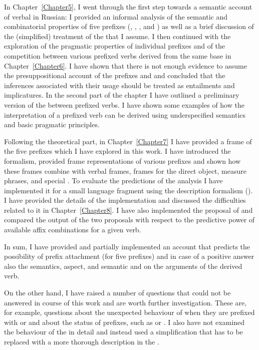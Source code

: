 In Chapter~\ref{Chapter5}, I went through the first step towards a semantic account of verbal  in Russian: I provided an informal analysis of the semantic and combinatorial properties of five prefixes (, , ,  and ) as well as a brief discussion of the (simplified) treatment of the  that I assume. I then continued with the exploration of the pragmatic properties of individual prefixes and of the competition between various prefixed verbs derived from the same base in Chapter~\ref{Chapter6}. I have shown that there is not enough evidence to assume the presuppositional account of the prefixes  and  and concluded that the inferences associated with their usage should be treated as entailments and implicatures. In the second part of the chapter I have outlined a preliminary version of the  between prefixed verbs. I have shown some examples of how the interpretation of a prefixed verb can be derived using underspecified semantics and basic pragmatic principles. 

Following the theoretical part,  in Chapter~\ref{Chapter7} I have provided a frame  of the five prefixes which I have explored in this work. I have introduced the formalism, provided frame representations of various prefixes and shown how these frames combine with verbal frames, frames for the direct object, measure phrases, and special . To evaluate the predictions of the analysis I have implemented it for a small language fragment using the  description formalism (). I have provided the details of the implementation and discussed the difficulties related to it in Chapter~\ref{Chapter8}. I have also implemented the proposal of \citet{Tatevosov:09} and compared the output of the two proposals with respect to the predictive power of available affix combinations for a given verb. 

In sum, I have provided and partially implemented an account that predicts the possibility of prefix attachment (for five prefixes) and in case of a positive answer also the semantics, aspect, and semantic and  on the arguments of the derived verb. 

On the other hand, I have raised a number of questions that could not be answered in course of this work and are worth further investigation. These are, for example, questions about the unexpected behaviour of   when they are prefixed with  or  and about the status of  prefixes, such as  or . I also have not examined the behaviour of the  in detail and instead used a simplification that has to be replaced with a more thorough description in the . 

